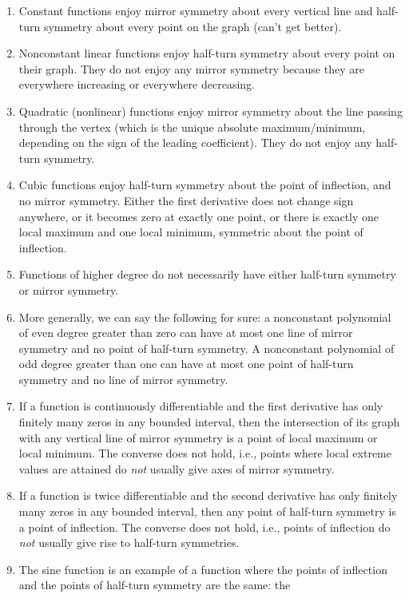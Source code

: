 \documentclass[10pt]{amsart}
\begin{document}
\begin{enumerate}
\item Constant functions enjoy mirror symmetry about every vertical
  line and half-turn symmetry about every point on the graph (can't
  get better).
\item Nonconstant linear functions enjoy half-turn symmetry about
  every point on their graph. They do not enjoy any mirror symmetry
  because they are everywhere increasing or everywhere decreasing.
\item Quadratic (nonlinear) functions enjoy mirror symmetry about the
  line passing through the vertex (which is the unique absolute
  maximum/minimum, depending on the sign of the leading
  coefficient). They do not enjoy any half-turn symmetry.
\item Cubic functions enjoy half-turn symmetry about the point of
  inflection, and no mirror symmetry. Either the first derivative does
  not change sign anywhere, or it becomes zero at exactly one point,
  or there is exactly one local maximum and one local minimum,
  symmetric about the point of inflection.
\item Functions of higher degree do not necessarily have either
  half-turn symmetry or mirror symmetry.
\item More generally, we can say the following for sure: a nonconstant
  polynomial of even degree greater than zero can have at most one
  line of mirror symmetry and no point of half-turn symmetry. A
  nonconstant polynomial of odd degree greater than one can have at
  most one point of half-turn symmetry and no line of mirror symmetry.
\item If a function is continuously differentiable and the first
  derivative has only finitely many zeros in any bounded interval,
  then the intersection of its graph with any vertical line of mirror
  symmetry is a point of local maximum or local minimum. The converse
  does not hold, i.e., points where local extreme values are attained
  do {\em not} usually give axes of mirror symmetry.
\item If a function is twice differentiable and the second derivative
  has only finitely many zeros in any bounded interval, then any point
  of half-turn symmetry is a point of inflection. The converse does
  not hold, i.e., points of inflection do {\em not} usually give rise
  to half-turn symmetries.
\item The sine function is an example of a function where the points
  of inflection and the points of half-turn symmetry are the same: the

\end{enumerate}
\end{document}
